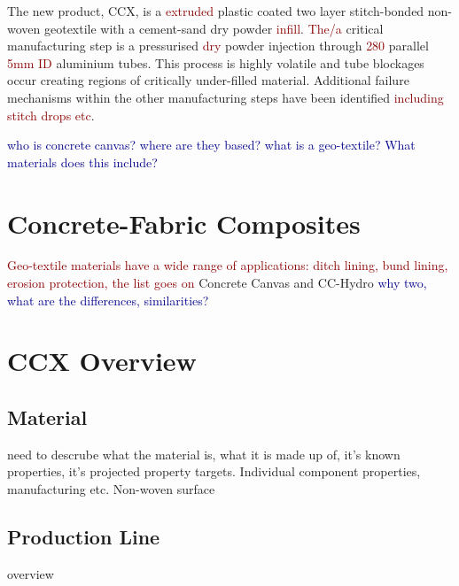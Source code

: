 \documentclass[12pt]{report}
\newcommand{\tcr}[1]{\textcolor{darkRed}{#1}}
\newcommand{\tcb}[1]{\textcolor{darkBlue}{#1}}
\begin{document}
    The new product, CCX, is a \tcr{extruded} plastic  coated two layer stitch-bonded non-woven geotextile with a cement-sand dry powder \tcr{infill}. \tcr{The/a} critical manufacturing step is a pressurised \tcr{dry} powder injection  through \tcr{280} parallel \tcr{5mm ID} aluminium tubes. This process is highly volatile and tube blockages occur creating regions of critically under-filled material. Additional failure mechanisms within the other manufacturing steps have been identified \tcr{including stitch drops etc}.
    
    \tcb{who is concrete canvas? where are they based?}
    \tcb{what is a geo-textile? What materials does this include?}
    
    
    \section{Concrete-Fabric Composites}
    \tcr{Geo-textile materials have a wide range of applications: ditch lining, bund lining, erosion protection, the list goes on}
    Concrete Canvas and CC-Hydro \tcb{why two, what are the differences, similarities?}
    
    \section{CCX Overview}
        \subsection{Material}
            need to descrube what the material is, what it is made up of, it's known properties, it's projected property targets. Individual component properties, manufacturing etc.
            Non-woven surface
        \subsection{Production Line}
            overview
            
\end{document}
